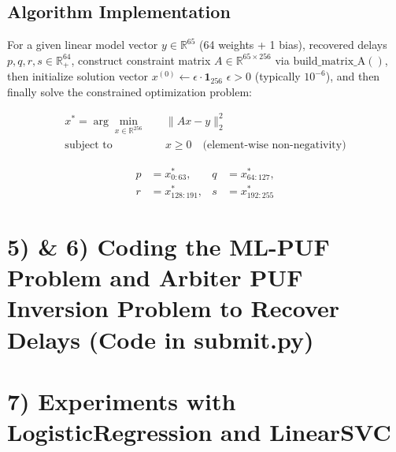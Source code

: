 \documentclass[11pt]{article}
\begin{document}
\subsection*{Algorithm Implementation}
For a given linear model vector $y \in \mathbb{R}^{65}$ (64 weights + 1 bias), recovered delays $p,q,r,s \in \mathbb{R}^{64}_+$, construct constraint matrix $A \in \mathbb{R}^{65 \times 256}$ via $\text{build\_matrix\_A}()$, then initialize solution vector $x^{(0)} \gets \epsilon \cdot \mathbf{1}_{256}$ {$\epsilon > 0$ (typically $10^{-6}$)}, and then finally solve the constrained optimization problem:

\[
\begin{aligned}
x^* = \arg\min_{x \in \mathbb{R}^{256}} \quad & \|A x - y\|_2^2 \\
\text{subject to} \quad & x \geq 0 \quad \text{(element-wise non-negativity)}
\end{aligned}
\]

\[
\begin{aligned}
p &= x^*_{0:63}, & q &= x^*_{64:127}, \\
r &= x^*_{128:191}, & s &= x^*_{192:255}
\end{aligned}
\]

\section*{5) \& 6) Coding the ML-PUF Problem and Arbiter PUF Inversion Problem to Recover Delays (Code in submit.py)}
\section*{7) Experiments with LogisticRegression and LinearSVC}
\end{document}
